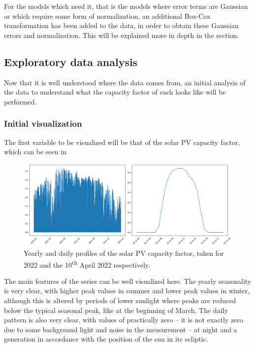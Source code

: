 For the models which need it, that is the models where error terms are Gaussian or which require some form of normalization, an additional Box-Cox transformation has been added to the data, in order to obtain these Gaussian errors and normalization. This will be explained more in depth in the  section.

\subsection{Exploratory data analysis}

Now that it is well understood where the data comes from, an initial analysis of the data to understand what the capacity factor of each looks like will be performed. 

\subsubsection{Initial visualization}
The first variable to be visualized will be that of the solar PV capacity factor, which can be seen in 
\begin{figure}[ht]
    \centering
    \captionsetup{justification=centering}
    \includegraphics[width=\linewidth]{assets/spv-year-day.png}
    \caption{Yearly and daily profiles of the solar PV capacity factor, taken for 2022 and the 10\textsuperscript{th} April 2022 respectively.}
    \label{fig:spv-year-day}
\end{figure}

The main features of the series can be well visualized here. The yearly seasonality is very clear, with higher peak values in summer and lower peak values in winter, although this is altered by periods of lower sunlight where peaks are reduced below the typical seasonal peak, like at the beginning of March. The daily pattern is also very clear, with values of practically zero -- it is not exactly zero due to some background light and noise in the measurement -- at night and a generation in accordance with the position of the sun in its ecliptic. 

